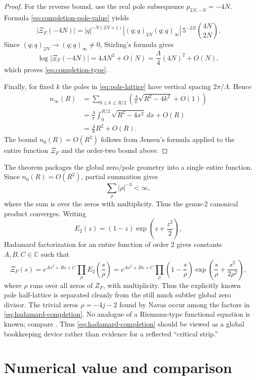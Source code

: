 \documentclass[11pt]{article}
\theoremstyle{remark}
\newcommand{\C}{\mathbb C}
\newcommand{\ZF}{Z_F}
\begin{document}
\begin{proof}
For the reverse bound, use the real pole subsequence $p_{2N,-N}=-4N$.  Formula \eqref{eq:completion-pole-value} yields
\[
|\Xi_F(-4N)|
=|q|^{-N(2N+1)}
|(q;q)_{2N}(q;q)_\infty|
\,5^{-2N}\binom{4N}{2N}.
\]
Since $(q;q)_{2N}\to(q;q)_\infty\ne0$, Stirling's formula gives
\[
\log|\Xi_F(-4N)|
=4\Lambda N^2+O(N)
=\frac{\Lambda}{4}(4N)^2+O(N),
\]
which proves \eqref{eq:completion-type}.

Finally, for fixed $k$ the poles in \eqref{eq:pole-lattice} have vertical spacing $2\pi/\Lambda$.  Hence
\begin{align*}
n_\infty(R)
&=\sum_{0\le k\le R/2}
\left(\frac{\Lambda}{\pi}\sqrt{R^2-4k^2}+O(1)\right)\\
&=\frac{\Lambda}{\pi}
\int_0^{R/2}\sqrt{R^2-4x^2}\,dx+O(R)\\
&=\frac{\Lambda}{8}R^2+O(R).
\end{align*}
The bound $n_0(R)=O(R^2)$ follows from Jensen's formula applied to the entire function $\Xi_F$ and the order-two bound above.
\end{proof}

The theorem packages the global zero/pole geometry into a single entire function.  Since $n_0(R)=O(R^2)$, partial summation gives
\[
\sum_{\rho}|\rho|^{-3}<\infty,
\]
where the sum is over the zeros with multiplicity.  Thus the genus-$2$ canonical product converges.  Writing
\[
E_2(z)=(1-z)\exp\!\left(z+\frac{z^2}{2}\right),
\]
Hadamard factorization for an entire function of order $2$ gives constants $A,B,C\in\C$ such that
\begin{equation}\label{eq:hadamard-completion}
\Xi_F(s)
=e^{As^2+Bs+C}
\prod_{\rho}E_2\!\left(\frac{s}{\rho}\right)
=e^{As^2+Bs+C}
\prod_{\rho}
\left(1-\frac{s}{\rho}\right)
\exp\!\left(\frac{s}{\rho}+\frac{s^2}{2\rho^2}\right),
\end{equation}
where $\rho$ runs over all zeros of $\ZF$, with multiplicity.  Thus the explicitly known pole half-lattice is separated cleanly from the still much subtler global zero divisor.  The trivial zeros $\rho=-4j-2$ found by Navas occur among the factors in \eqref{eq:hadamard-completion}.  No analogue of a Riemann-type functional equation is known; compare \cite{Navas2001}.  Thus \eqref{eq:hadamard-completion} should be viewed as a global bookkeeping device rather than evidence for a reflected ``critical strip.''

\section{Numerical value and comparison}
\end{document}
